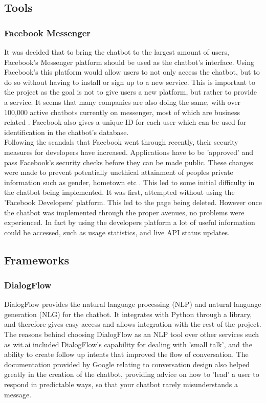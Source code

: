 \documentclass[12pt,a4paper]{article}
\begin{document}
    \subsection{Tools}
    \subsubsection{Facebook Messenger}
    It was decided that to bring the chatbot to the largest amount of users, Facebook's Messenger platform should be used as the chatbot's interface. Using Facebook's this platform would allow users to not only access the chatbot, but to do so without having to install or sign up to a new service. This is important to the project as the goal is not to give users a new platform, but rather to provide a service. It seems that many companies are also doing the same, with over 100,000 active chatbots currently on messenger, most of which are business related \citep{Parr17}. Facebook also gives a unique ID for each user which can be used for identification in the chatbot's database. \\
    
    Following the scandals that Facebook went through recently, their security measures for developers have increased. Applications have to be 'approved' and pass Facebook's security checks before they can be made public. These changes were made to prevent potentially unethical attainment of peoples private information such as gender, hometown etc \citep{Perez18}. This led to some initial difficulty in the chatbot being implemented. It was first, attempted without using the 'Facebook Developers' platform. This led to the page being deleted. However once the chatbot was implemented through the proper avenues, no problems were experienced. In fact by using the developers platform a lot of useful information could be accessed, such as usage statistics, and live API status updates.
    
    \subsection{Frameworks}
    
    \subsubsection{DialogFlow}
    DialogFlow provides the natural language processing (NLP) and natural language generation (NLG) for the chatbot. It integrates with Python through a library, and therefore gives easy access and allows integration with the rest of the project. The reasons behind choosing DialogFlow as an NLP tool over other services such as wit.ai included DialogFlow's capability for dealing with 'small talk', and the ability to create follow up intents that improved the flow of conversation. The documentation provided by Google relating to conversation design also helped greatly in the creation of the chatbot, providing advice on how to 'lead' a user to respond in predictable ways, so that your chatbot rarely misunderstands a message. \\
    
\end{document}
